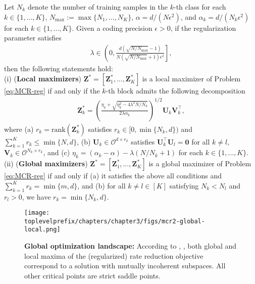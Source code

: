 \documentclass[../../book-main.tex]{subfiles}
\begin{document}
\begin{theorem}\label{thm:mcr-global-opt}
	Let $N_k$ denote the number of training samples in the $k$-th class for each $k \in \{1,\dots,K\}$, $N_{\max} := \max\{N_1,\dots,N_K\}$, $\alpha=d/(N\epsilon^2)$, and $\alpha_{k} = d/(N_k\epsilon^2)$ for each $k \in \{1,\dots,K\}$. Given a coding precision $\epsilon > 0$, if the regularization parameter satisfies
	\begin{align}\label{eq:lambda}
		\lambda \in \left(0, \frac{d(\sqrt{N/N_{\max}}-1)}{N(\sqrt{N/N_{\max}}+1)\epsilon^2} \right],
	\end{align}
	then the following statements hold: \\
	(i) ({\bf Local maximizers}) $\bm Z^* = \left[\bm Z_1^*,\dots,\bm Z_K^* \right]$ is a local maximizer of Problem \eqref{eq:MCR-reg} if and only if the $k$-th block admits the following decomposition
	\begin{align}\label{eq:Zk opti}
		\bm Z_k^* = \left(\frac{ \eta_k + \sqrt{\eta_k^2 - 4\lambda^2N/N_k}}{2\lambda \alpha_{k}}\right)^{1/2} \bm U_k \bm V_k^\top,
	\end{align}
	where (a) $r_k = \mathrm{rank}(\bm Z_k^*)$ satisfies $r_k \in [0,\min\{N_k,d\})$ and $\sum_{k=1}^K r_k \le \min\{N,d\}$, (b) $\bm U_k \in \mathcal{O}^{d \times r_k}$ satisfies $\bm U_k^{\top}\bm U_l = \bm 0$ for all $k \neq l$, $\bm V_k \in \mathcal{O}^{N_k \times r_k}$, and (c) $\eta_k=(\alpha_k-\alpha) - \lambda(N/N_k+1)$ for each $k\in \{1,\dots,K\}$.
	\\
	(ii) ({\bf Global maximizers}) $\bm Z^* = \left[\bm Z_1^*,\dots,\bm Z_K^* \right]$ is a global maximizer of Problem \eqref{eq:MCR-reg} if and only if (a) it satisfies the above all conditions and $\sum_{k=1}^K r_k = \min\{m,d\}$, and (b) for all $k \neq l \in [K]$ satisfying $N_k < N_l$ and $r_l > 0$, we have $r_k = \min\{N_k,d\}$.
\end{theorem}

\begin{figure}[t]
	\centering
	\texttt{[image: \\toplevelprefix/chapters/chapter3/figs/mcr2-global-local.png]}
	\caption{{\bf Global optimization landscape:} According to \cite{sun2015nonconvex,lee2016gradient}, , both global and local maxima of the (regularized) rate reduction objective correspond to a solution with mutually incoherent subspaces. All other critical points are strict saddle points.}
	\label{fig:mcr-global-local}
\end{figure}
\end{document}
